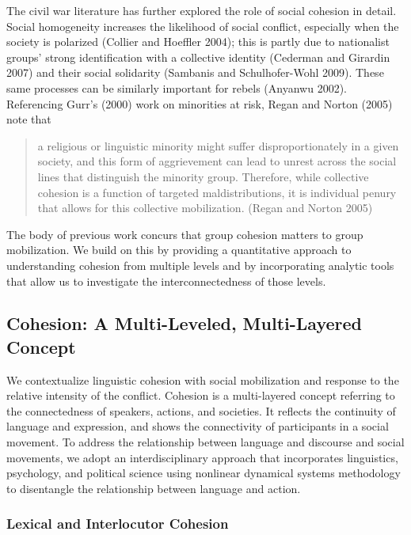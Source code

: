 \documentclass[
  english,
  man]{apa6}
\begin{document}
The civil war literature has further explored the role of social cohesion in
detail. Social homogeneity increases the likelihood of social conflict,
especially when the society is polarized (Collier and Hoeffler 2004); this is partly
due to nationalist groups' strong identification with a collective identity
(Cederman and Girardin 2007) and their social solidarity (Sambanis and Schulhofer-Wohl 2009). These
same processes can be similarly important for rebels (Anyanwu 2002).
Referencing Gurr's (2000) work on minorities at
risk, Regan and Norton (2005) note that

\begin{quote}
a religious or linguistic minority
might suffer disproportionately in a given society, and this form of
aggrievement can lead to unrest across the social lines that distinguish the
minority group. Therefore, while collective cohesion is a function of targeted
maldistributions, it is individual penury that allows for this collective
mobilization. (Regan and Norton 2005)
\end{quote}

The body of previous work concurs that group cohesion matters to group
mobilization. We build on this by providing a quantitative approach to
understanding cohesion from multiple levels and by incorporating analytic tools
that allow us to investigate the interconnectedness of those levels.

\hypertarget{cohesion-a-multi-leveled-multi-layered-concept}{%
\subsection{Cohesion: A Multi-Leveled, Multi-Layered Concept}\label{cohesion-a-multi-leveled-multi-layered-concept}}

We contextualize linguistic cohesion with social mobilization and response to
the relative intensity of the conflict. Cohesion is a multi-layered concept
referring to the connectedness of speakers, actions, and societies. It
reflects the continuity of language and expression, and shows the
connectivity of participants in a social movement. To address the relationship
between language and discourse and social movements, we adopt an
interdisciplinary approach that incorporates linguistics, psychology, and
political science using nonlinear dynamical systems methodology to disentangle the
relationship between language and action.

\hypertarget{lexical-and-interlocutor-cohesion}{%
\subsubsection{Lexical and Interlocutor Cohesion}\label{lexical-and-interlocutor-cohesion}}
\end{document}
